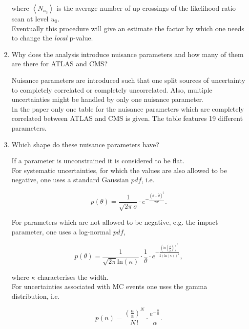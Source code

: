 \documentclass[10pt]{article}
\newenvironment{myfont}{\fontfamily{put}\selectfont}{\par}
\begin{document}
\begin{myfont}
\begin{enumerate}[label = \textbf{\roman*}.]
  \noindent where $\left<N_{u_{0}}\right>$ is the average number of up-crossings of the likelihood ratio scan at level $u_{0}$. \\

  \noindent Eventually this procedure will give an estimate the factor by which one needs to change the \textit{local} p-value.

  \item Why does the analysis introduce nuisance parameters and how many of them are there for ATLAS and CMS?

  \noindent Nuisance parameters are introduced such that one split sources of uncertainty to completely correlated or completely uncorrelated.
  Also, multiple uncertainties might be handled by only one nuisance parameter. \\
  In the paper only one table for the nuisance parameters which are completely correlated between ATLAS and CMS is given.
  The table features 19 different parameters.

  \item Which shape do these nuisance parameters have?

  \noindent If a parameter is unconstrained it is considered to be flat. \\
  For systematic uncertainties, for which the values are also allowed to be negative, one uses a standard Gaussian $pdf$, i.e.

  \begin{equation}
  	p\left(\theta\right) = \frac{1}{\sqrt{2\pi}\sigma} \cdot e^{-\frac{(\theta - \tilde{\theta})^{2}}{2\sigma^{2}}}.
  \end{equation}

  \noindent For parameters which are not allowed to be negative, e.g. the impact parameter, one uses a log-normal $pdf$,

  \begin{equation}
  	p\left(\theta\right) = \frac{1}{\sqrt{2\pi}\textrm{ln}(\kappa)} \cdot \frac{1}{\theta} \cdot e^{-\frac{\left(\textrm{ln}\left(\frac{\theta}{\tilde{\theta}}\right)\right)^{2}}{2\left(\textrm{ln}(\kappa)\right)^{2}}},
  \end{equation}

  \noindent where $\kappa$ characterises the width. \\
  For uncertainties associated with MC events one uses the gamma distribution, i.e.

  \begin{equation}
  	p(n) = \frac{\left(\frac{n}{\alpha}\right)^{N}}{N\,!} \cdot \frac{e^{-\frac{n}{\alpha}}}{\alpha}.
  \end{equation}



\end{enumerate}
\end{myfont}
\end{document}
